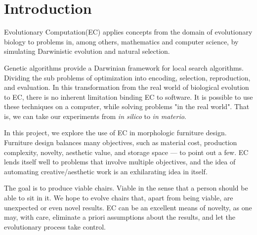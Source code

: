 \section{Introduction}
Evolutionary Computation(EC) applies concepts from the domain of evolutionary
biology to problems in, among others, mathematics and computer science,
by simulating Darwinistic evolution and natural selection.

Genetic algorithms provide a Darwinian framework for local search algorithms.
Dividing the sub problems of optimization into encoding, selection,
reproduction, and evaluation. In this transformation from the real world of
biological evolution to EC, there is no inherent limitation binding EC to
software. It is possible to use these techniques on a computer, while solving
problems "in the real world". That is, we can take our experiments from
\emph{in silico} to \emph{in materio}\cite{paper:ev3}.

In this project, we explore the use of EC in morphologic furniture design.
Furniture design balances many objectives, such as material cost, production
complexity, novelty, aesthetic value, and storage space --- to point out a few.
EC lends itself well to problems that involve multiple objectives, and the idea
of automating creative/aesthetic work is an exhilarating idea in itself.

The goal is to produce viable chairs. Viable in the sense that a person should 
be able to sit in it. We hope to evolve chairs that, apart from being viable,
are unexpected or even novel results. EC can be an excellent means of novelty,
as one may, with care, eliminate a priori assumptions about the results, and let
the evolutionary process take control.

